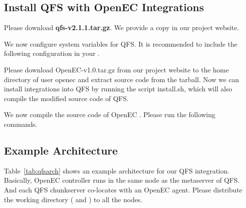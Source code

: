 \documentclass[letterpaper,12pt]{article}
\newcommand{\openec}{{\sf\small OpenEC}\xspace}
\begin{document}
\subsection{Install QFS with OpenEC Integrations}

Please download {\bf qfs-v2.1.1.tar.gz}. We provide a copy in our project website.

\begin{center}
\noindent{}
\end{center}

We now configure system variables for QFS. It is recommended to include the
following configuration in your .

\begin{center}
\noindent{}
\end{center}

Please download OpenEC-v1.0.tar.gz from our project website to the home directory of user openec
and extract source code from the tarball. Now we can install integrations into QFS by
running the script install.sh, which will also compile the modified source code of QFS.

\begin{center}
\noindent{}
\end{center}

We now compile the source code of OpenEC . Please run the following commands.

\begin{center}
\noindent{}
\end{center}

\subsection{Example Architecture}

Table~\ref{tab:qfsarch} shows an example architecture for our QFS integration.
Basically, \openec controller runs in the same node as the metaserver of QFS.
And each QFS chunkserver co-locates with an \openec agent. Please distribute
the working directory ( and ) to all 
the nodes.
\end{document}
